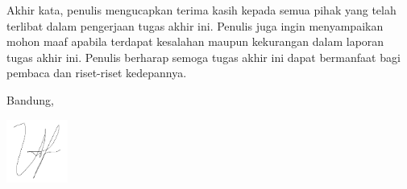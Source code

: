 Akhir kata, penulis mengucapkan terima kasih kepada semua pihak yang telah terlibat dalam pengerjaan tugas akhir ini. Penulis juga ingin menyampaikan mohon maaf apabila terdapat kesalahan maupun kekurangan dalam laporan tugas akhir ini. Penulis berharap semoga tugas akhir ini dapat bermanfaat bagi pembaca dan riset-riset kedepannya.

\begin{flushright}
	\vspace{0.5cm}
	Bandung, \tanggalpengesahan

	\includegraphics[width=0.15\textwidth]{images/sign.png}

	\namapenulis
\end{flushright}